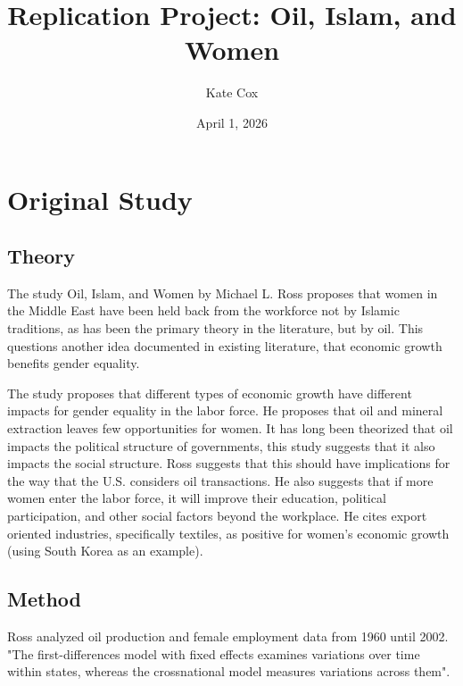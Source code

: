 \documentclass[12pt,letterpaper]{article}
\title{Replication Project: Oil, Islam, and Women}
\date{April 1, 2026}
\author{Kate Cox}
\begin{document}
	\maketitle
	\section*{Original Study}
	\vspace{.25cm}
	
	\subsection*{Theory}
	
	\vspace{.25cm}
	
	\noindent The study Oil, Islam, and Women by Michael L. Ross proposes that women in the Middle East have been held back from the workforce not by Islamic traditions, as has been the primary theory in the literature, but by oil. This questions another idea documented in existing literature, that economic growth benefits gender equality.
	
	\vspace{.5cm}
	
	\noindent The study proposes that different types of economic growth have different impacts for gender equality in the labor force. He proposes that oil and mineral extraction leaves few opportunities for women. It has long been theorized that oil impacts the political structure of governments, this study suggests that it also impacts the social structure. Ross suggests that this should have implications for the way that the U.S. considers oil transactions. He also suggests that if more women enter the labor force, it will improve their education, political participation, and other social factors beyond the workplace. He cites export oriented industries, specifically textiles, as positive for women's economic growth (using South Korea as an example).
	
	\vspace{.5cm}
	 
	\subsection*{Method}

	\vspace{.25cm}
	
	\noindent Ross analyzed oil production and female employment data from 1960 until 2002. "The first-differences model with fixed effects examines variations over time within states, whereas the crossnational model measures variations across them".
	
\end{document}
